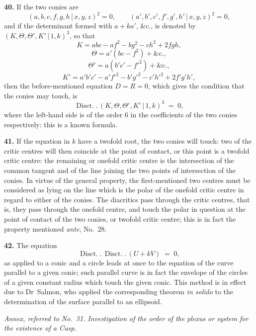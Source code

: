 \documentclass[11pt,a4paper]{article}
\providecommand{\mid}{\,|\,}
\providecommand{\Disct}{\operatorname{Disct.}}
\begin{document}
\medskip

\textbf{40.} If the two conies are
\[
(a, b, c, f, g, h \mid x, y, z)^2 = 0,\qquad (a', b', c', f', g', h' \mid x, y, z)^2 = 0,
\]
and if the determinant formed with $a + ka'$, \&c., is denoted by $(K, \Theta, \Theta', K' \mid 1, k)^3$, so that
\[
K = abc - af^2 - bg^2 - ch^2 + 2fgh,
\]
\[
\Theta = a'(bc - f^2) + \mathrm{\&c.},
\]
\[
\Theta' = a(b'c' - f'^2) + \mathrm{\&c.},
\]
\[
K' = a'b'c' - a'f'^2 - b'g'^2 - c'h'^2 + 2f'g'h',
\]
then the before-mentioned equation $D = R = 0$, which gives the condition that the conies may touch, is
\[
\Disct.\,(K, \Theta, \Theta', K' \mid 1, k)^3 \;=\; 0,
\]
where the left-hand side is of the order $6$ in the coefficients of the two conies respectively: this is a known formula.

\medskip

\textbf{41.} If the equation in $k$ have a twofold root, the two conies will touch: two of the critic centres will then coincide at the point of contact, or this point is a twofold critic centre: the remaining or onefold critic centre is the intersection of the common tangent and of the line joining the two points of intersection of the conies. In virtue of the general property, the first-mentioned two centres must be considered as lying on the line which is the polar of the onefold critic centre in regard to either of the conies. The diacritics pass through the critic centres, that is, they pass through the onefold centre, and touch the polar in question at the point of contact of the two conies, or twofold critic centre; this is in fact the property mentioned \textit{ante}, No.~28.

\medskip

\textbf{42.} The equation
\[
\Disct.\,\Disct.\,(U + kV) \;=\; 0,
\]
as applied to a conic and a circle leads at once to the equation of the curve parallel to a given conic; such parallel curve is in fact the envelope of the circles of a given constant radius which touch the given conic. This method is in effect due to Dr~Salmon, who applied the corresponding theorem \emph{in solido} to the determination of the surface parallel to an ellipsoid.

\begin{center}
\textit{Annex, referred to No.~31. Investigation of the order of the plexus or system for the existence of a Cusp.}
\end{center}
\end{document}
